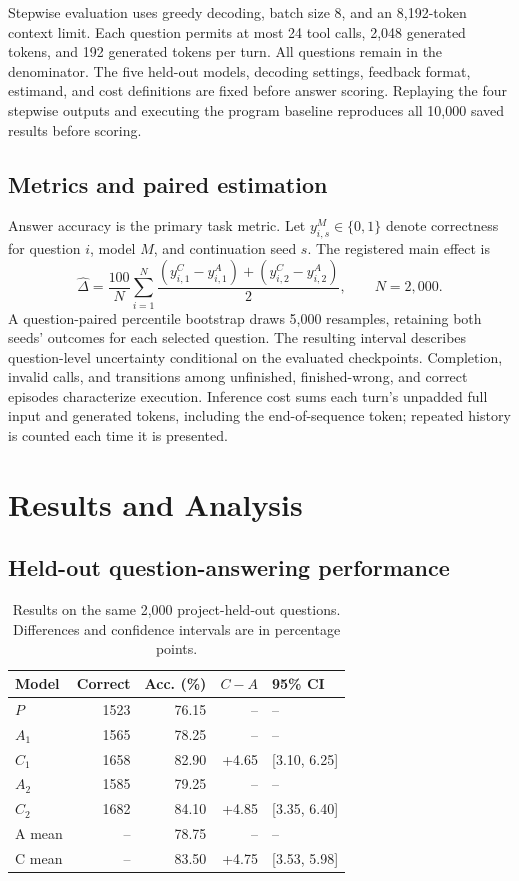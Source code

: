 \documentclass[a4paper,12pt]{article}
\begin{document}
Stepwise evaluation uses greedy decoding, batch size 8, and an 8,192-token context limit. Each question permits at most 24 tool calls, 2,048 generated tokens, and 192 generated tokens per turn. All questions remain in the denominator. The five held-out models, decoding settings, feedback format, estimand, and cost definitions are fixed before answer scoring. Replaying the four stepwise outputs and executing the program baseline reproduces all 10,000 saved results before scoring.

\subsection{Metrics and paired estimation}

Answer accuracy is the primary task metric. Let $y_{i,s}^M\in\{0,1\}$ denote correctness for question $i$, model $M$, and continuation seed $s$. The registered main effect is
\begin{equation}
 \widehat\Delta=\frac{100}{N}\sum_{i=1}^{N}
 \frac{(y_{i,1}^{C}-y_{i,1}^{A})+(y_{i,2}^{C}-y_{i,2}^{A})}{2},
 \qquad N=2{,}000.
\end{equation}
A question-paired percentile bootstrap draws 5,000 resamples, retaining both seeds' outcomes for each selected question. The resulting interval describes question-level uncertainty conditional on the evaluated checkpoints. Completion, invalid calls, and transitions among unfinished, finished-wrong, and correct episodes characterize execution. Inference cost sums each turn's unpadded full input and generated tokens, including the end-of-sequence token; repeated history is counted each time it is presented.

\section{Results and Analysis}

\subsection{Held-out question-answering performance}

\begin{table}[htbp]
 \centering
 \caption{Results on the same 2,000 project-held-out questions. Differences and confidence intervals are in percentage points.}
 \label{tab:main-en}
 \begin{tabular}{@{}lrrrl@{}}
\toprule
Model & Correct & Acc. (\%) & $C-A$ & 95\% CI \\
\midrule
$P$ & 1523 & 76.15 & -- & -- \\
$A_{1}$ & 1565 & 78.25 & -- & -- \\
$C_{1}$ & 1658 & 82.90 & +4.65 & [3.10, 6.25] \\
$A_{2}$ & 1585 & 79.25 & -- & -- \\
$C_{2}$ & 1682 & 84.10 & +4.85 & [3.35, 6.40] \\
A mean & -- & 78.75 & -- & -- \\
C mean & -- & 83.50 & +4.75 & [3.53, 5.98] \\
\bottomrule
\end{tabular}
\end{table}
\end{document}
